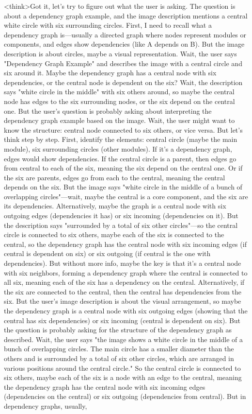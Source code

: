 <think>Got it, let's try to figure out what the user is asking. The question is about a dependency graph example, and the image description mentions a central white circle with six surrounding circles. First, I need to recall what a dependency graph is—usually a directed graph where nodes represent modules or components, and edges show dependencies (like A depends on B). But the image description is about circles, maybe a visual representation. Wait, the user says "Dependency Graph Example" and describes the image with a central circle and six around it. Maybe the dependency graph has a central node with six dependencies, or the central node is dependent on the six? Wait, the description says "white circle in the middle" with six others around, so maybe the central node has edges to the six surrounding nodes, or the six depend on the central one. But the user's question is probably asking about interpreting the dependency graph example based on the image. Wait, the user might want to know the structure: central node connected to six others, or vice versa. But let's think step by step. First, identify the elements: central circle (maybe the main module), six surrounding circles (other modules). If it's a dependency graph, edges would show dependencies. If the central circle is a parent, then edges go from central to each of the six, meaning the six depend on the central one. Or if the six are parents, edges go from each to the central, meaning the central depends on the six. But the image says "white circle in the middle of a bunch of overlapping circles"—wait, maybe the central is a core component, and the six are its dependencies. Alternatively, maybe the graph is a central node with six outgoing edges (dependencies it has) or six incoming (dependencies on it). But the description says "surrounded by a total of six other circles"—so the central circle is connected to six others, maybe each of the six is connected to the central, so the dependency graph has the central node with six incoming edges (if central is dependent on six) or six outgoing (if central is the one with dependencies). But without more info, maybe the key is that it's a central node with six neighbors, forming a dependency graph where the central is connected to all six, meaning each of the six has a dependency on the central. Alternatively, if the six are connected to the central, then the central has dependencies from the six. But the user's image description is about the visual arrangement, so maybe the dependency graph is a central node with six outgoing edges (showing that the central has six dependencies) or six incoming (central is dependent on six). But the question is probably asking for the structure of the dependency graph as described. Wait, the user says "the image shows a white circle in the middle of a bunch of overlapping circles. The main circle has a smaller diameter than the others and is surrounded by a total of six other circles, which are arranged in various positions around the central circle." So the central circle is connected to six others, maybe each of the six is a node with an edge to the central, meaning the dependency graph has the central node with six incoming edges (dependencies on the central) or six outgoing (dependencies from central). But in dependency graphs, usually, 